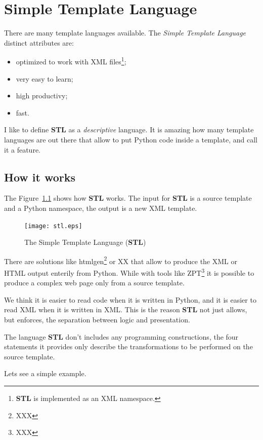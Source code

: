 \chapter{Simple Template Language}
\label{Chapter: STL}

There are many template languages available. The {\em Simple Template
Language} distinct attributes are:

\begin{itemize}
  \item optimized to work with XML files\footnote{{\bf STL} is implemented
    as an XML namespace.};
  \item very easy to learn;
  \item high productivy;
  \item fast.
\end{itemize}

I like to define {\bf STL} as a {\em descriptive} language. It is amazing
how many template languages are out there that allow to put Python code
inside a template, and call it a feature.


\section{How it works}

The Figure~\ref{Figure: stl} shows how {\bf STL} works. The input for
{\bf STL} is a source template and a Python namespace, the output is
a new XML template.

\begin{figure}
  \center
  \texttt{[image: stl.eps]}
  \caption{The Simple Template Language ({\bf STL})}
  \label{Figure: stl}
\end{figure}

There are solutions like htmlgen\footnote{XXX} or XX that allow to produce
the XML or HTML output enterily from Python. While with tools like
ZPT\footnote{XXX} it is possible to produce a complex web page only from
a source template.

We think it is easier to read code when it is written in Python, and it is
easier to read XML when it is written in XML. This is the reason {\bf STL}
not just allows, but enforces, the separation between logic and presentation.

The language {\bf STL} don't includes any programming constructions, the
four statements it provides only describe the transformations to be
performed on the source template.

Lets see a simple example.

